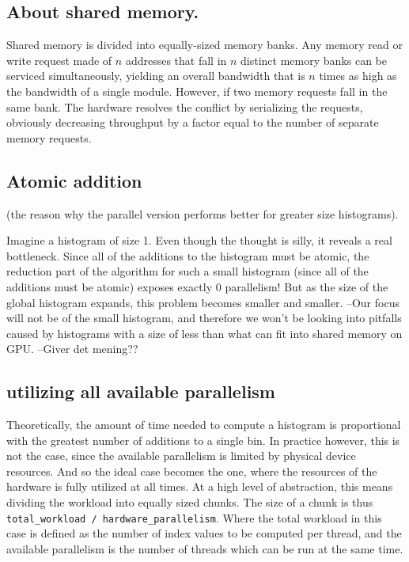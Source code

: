 \documentclass[12pt, a4paper, hidelinks]{article}
\renewcommand{\tt}[1]{\texttt{#1}}
\begin{document}
\subsection{About shared memory.}
Shared memory is divided into equally-sized memory banks.
Any memory read or write request made of $n$ addresses that fall in $n$
distinct memory banks can be serviced simultaneously, yielding an overall bandwidth
that is $n$ times as high as the bandwidth of a single module.
However, if two memory requests fall in the same bank.
The hardware resolves the conflict by serializing the requests,
obviously decreasing throughput by a factor equal to the number of
separate memory requests.


\subsection{Atomic addition}
(the reason why the parallel version performs better for greater size histograms).

Imagine a histogram of size 1. Even though the thought is silly,
it reveals a real bottleneck. Since all of the additions to the
histogram must be atomic, the reduction part of the algorithm for
such a small histogram (since all of the additions must be atomic)
exposes exactly 0 parallelism! But as the size of the global histogram
expands, this problem becomes smaller and smaller.
--Our focus will not be of the small histogram, and therefore we won’t be
looking into pitfalls caused by histograms with a size of less than what
can fit into shared memory on GPU. --Giver det mening??

\subsection{utilizing all available parallelism}
Theoretically, the amount of time needed to compute a histogram is
proportional with the greatest number of additions to a single bin.
In practice however, this is not the case,
since the available parallelism is limited by physical device resources.
And so the ideal case becomes the one,
where the resources of the hardware is fully utilized at all times.
At a high level of abstraction, this means dividing the workload into
equally sized chunks. The size of a chunk is thus
\tt{total\_workload / hardware\_parallelism}.
Where the total workload in this case is defined as the number of index values
to be computed per thread, and the available parallelism is the number of
threads which can be run at the same time.
\end{document}
